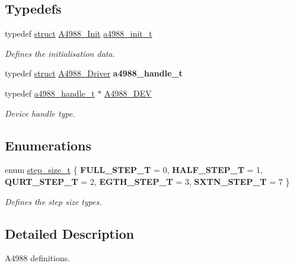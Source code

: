 \subsection*{Typedefs}
\begin{DoxyCompactItemize}
\item 
\mbox{\label{group__A4988__definitions_gac5bf19333196aea92a3ab2fa176b7f65}} 
typedef \hyperlink{structstruct}{struct} \hyperlink{structA4988__Init}{A4988\+\_\+\+Init} \hyperlink{group__A4988__definitions_gac5bf19333196aea92a3ab2fa176b7f65}{a4988\+\_\+init\+\_\+t}
\begin{DoxyCompactList}\small\item\em Defines the initialisation data. \end{DoxyCompactList}\item 
\mbox{\label{group__A4988__definitions_gafc008dff0ba0648dc8b3d953a5afb4fa}} 
typedef \hyperlink{structstruct}{struct} \hyperlink{structA4988__Driver}{A4988\+\_\+\+Driver} {\bfseries a4988\+\_\+handle\+\_\+t}
\item 
\mbox{\label{group__A4988__definitions_ga16590a9dd79ad8fcf4c317be2659b6c5}} 
typedef \hyperlink{structA4988__Driver}{a4988\+\_\+handle\+\_\+t} $\ast$ \hyperlink{group__A4988__definitions_ga16590a9dd79ad8fcf4c317be2659b6c5}{A4988\+\_\+\+D\+EV}
\begin{DoxyCompactList}\small\item\em Device handle type. \end{DoxyCompactList}\end{DoxyCompactItemize}
\subsection*{Enumerations}
\begin{DoxyCompactItemize}
\item 
\mbox{\label{group__A4988__definitions_gad84fc402211d9487e63ee884e4d79531}} 
enum \hyperlink{group__A4988__definitions_gad84fc402211d9487e63ee884e4d79531}{step\+\_\+size\+\_\+t} \{ \newline
{\bfseries F\+U\+L\+L\+\_\+\+S\+T\+E\+P\+\_\+T} = 0, 
{\bfseries H\+A\+L\+F\+\_\+\+S\+T\+E\+P\+\_\+T} = 1, 
{\bfseries Q\+U\+R\+T\+\_\+\+S\+T\+E\+P\+\_\+T} = 2, 
{\bfseries E\+G\+T\+H\+\_\+\+S\+T\+E\+P\+\_\+T} = 3, 
\newline
{\bfseries S\+X\+T\+N\+\_\+\+S\+T\+E\+P\+\_\+T} = 7
 \}\begin{DoxyCompactList}\small\item\em Defines the step size types. \end{DoxyCompactList}
\end{DoxyCompactItemize}


\subsection{Detailed Description}
A4988 definitions. 

